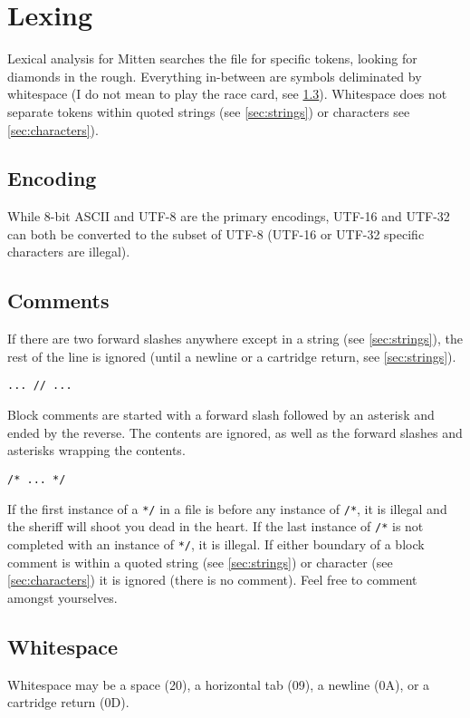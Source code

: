 \documentclass[10pt,a4paper]{article}
\begin{document}
\section{Lexing}
Lexical analysis for Mitten searches the file for specific tokens, looking for diamonds in the rough. Everything in-between are symbols deliminated by whitespace (I do not mean to play the race card, see \ref{sec:whitespace}). Whitespace does not separate tokens within quoted strings (see \ref{sec:strings}) or characters see \ref{sec:characters}).

\subsection{Encoding}
While 8-bit ASCII and UTF-8 are the primary encodings, UTF-16 and UTF-32 can both be converted to the subset of UTF-8 (UTF-16 or UTF-32 specific characters are illegal).

\subsection{Comments}
\label{sec:comments}
If there are two forward slashes anywhere except in a string (see \ref{sec:strings}), the rest of the line is ignored (until a newline or a cartridge return, see \ref{sec:strings}).
\begin{verbatim}
... // ...
\end{verbatim}

Block comments are started with a forward slash followed by an asterisk and ended by the reverse. The contents are ignored, as well as the forward slashes and asterisks wrapping the contents.
\begin{verbatim}
/* ... */
\end{verbatim}

If the first instance of a \verb|*/| in a file is before any instance of \verb|/*|, it is illegal and the sheriff will shoot you dead in the heart. If the last instance of \verb|/*| is not completed with an instance of \verb|*/|, it is illegal. If either boundary of a block comment is within a quoted string (see \ref{sec:strings}) or character (see \ref{sec:characters}) it is ignored (there is no comment). Feel free to comment amongst yourselves. 

\subsection{Whitespace}
\label{sec:whitespace}
Whitespace may be a space (20), a horizontal tab (09), a newline (0A), or a cartridge return (0D). 
\end{document}
